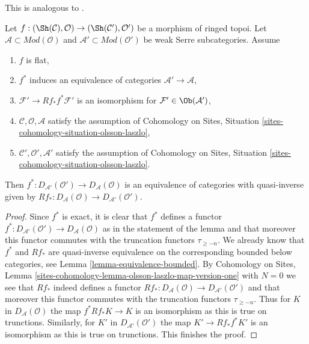 \begin{lemma}
\label{lemma-equivalence-unbounded-one}
\begin{reference}
This is analogous to \cite[Theorem 2.2.3]{six-I}.
\end{reference}
Let $f : (\Sh(\mathcal{C}), \mathcal{O}) \to (\Sh(\mathcal{C}'), \mathcal{O}')$
be a morphism of ringed topoi.
Let $\mathcal{A} \subset \textit{Mod}(\mathcal{O})$
and $\mathcal{A}' \subset \textit{Mod}(\mathcal{O}')$
be weak Serre subcategories. Assume
\begin{enumerate}
\item $f$ is flat,
\item $f^*$ induces an equivalence of categories
$\mathcal{A}' \to \mathcal{A}$,
\item $\mathcal{F}' \to Rf_*f^*\mathcal{F}'$ is an isomorphism
for $\mathcal{F}' \in \Ob(\mathcal{A}')$,
\item $\mathcal{C}, \mathcal{O}, \mathcal{A}$ satisfy the
assumption of
Cohomology on Sites, Situation \ref{sites-cohomology-situation-olsson-laszlo},
\item $\mathcal{C}', \mathcal{O}', \mathcal{A}'$ satisfy the
assumption of
Cohomology on Sites, Situation \ref{sites-cohomology-situation-olsson-laszlo}.
\end{enumerate}
Then $f^* : D_{\mathcal{A}'}(\mathcal{O}') \to D_\mathcal{A}(\mathcal{O})$
is an equivalence of categories with quasi-inverse given by
$Rf_* : D_\mathcal{A}(\mathcal{O}) \to D_{\mathcal{A}'}(\mathcal{O}')$.
\end{lemma}

\begin{proof}
Since $f^*$ is exact, it is clear that $f^*$ defines a functor
$f^* : D_{\mathcal{A}'}(\mathcal{O}') \to D_\mathcal{A}(\mathcal{O})$
as in the statement of the lemma and that moreover this
functor commutes with the truncation functors $\tau_{\geq -n}$.
We already know that $f^*$ and $Rf_*$ are quasi-inverse
equivalence on the corresponding bounded below categories,
see Lemma \ref{lemma-equivalence-bounded}.
By Cohomology on Sites, Lemma
\ref{sites-cohomology-lemma-olsson-laszlo-map-version-one}
with $N = 0$ we see that $Rf_*$ indeed defines a functor
$Rf_* : D_\mathcal{A}(\mathcal{O}) \to D_{\mathcal{A}'}(\mathcal{O}')$
and that moreover this functor commutes with
the truncation functors $\tau_{\geq -n}$.
Thus for $K$ in $D_\mathcal{A}(\mathcal{O})$ the map
$f^*Rf_*K \to K$ is an isomorphism as this is true
on trunctions.
Similarly, for $K'$ in $D_{\mathcal{A}'}(\mathcal{O}')$ the map
$K' \to Rf_*f^*K'$ is an isomorphism as this is true
on trunctions.
This finishes the proof.
\end{proof}

